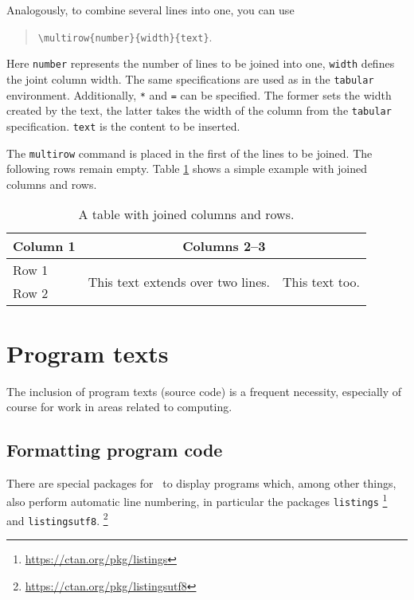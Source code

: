 Analogously, to combine several lines into one, you can use
%
\begin{quote}
    \verb!\multirow{number}{width}{text}!.
\end{quote}
%
Here \texttt{number} represents the number of lines to be joined into one,
\texttt{width} defines the joint column width. The same specifications are
used as in the \texttt{tabular} environment. Additionally, \texttt{*} and
\texttt{=} can be specified. The former sets the width created by the text,
the latter takes the width of the column from the \texttt{tabular}
specification. \texttt{text} is the content to be inserted.

The \verb|multirow| command is placed in the first of the lines to be joined.
The following rows remain empty. Table \ref{tab:multi-column-row-table} shows
a simple example with joined columns and rows.


\begin{table}[htbp]
    \caption{A table with joined columns and rows.}
    \label{tab:multi-column-row-table}
    \centering
    \setlength{\tabcolsep}{10pt} %
    \renewcommand{\arraystretch}{1.25}      %
    \begin{tabular}{@{}lll@{}}
        \toprule
        Column 1 & \multicolumn{2}{c}{Columns 2--3} \\
        \midrule
        Row 1 &
        \multirow{2}{4cm}{This text extends over two lines.} &
        \multirow{2}{*}{This text too.} \\
        Row 2 & & \\
        \bottomrule
    \end{tabular}
\end{table}


\section{Program texts}
\label{sec:program-texts}

The inclusion of program texts (source code) is a frequent necessity,
especially of course for work in areas related to computing.

\subsection{Formatting program code}
\label{sec:FormattingProgramCode}

There are special packages for \latex\ to display programs which, among other
things, also perform automatic line numbering, in particular the packages
\texttt{listings}%
\footnote{\url{https://ctan.org/pkg/listings}}
and \texttt{listingsutf8}.%
\footnote{\url{https://ctan.org/pkg/listingsutf8}}

